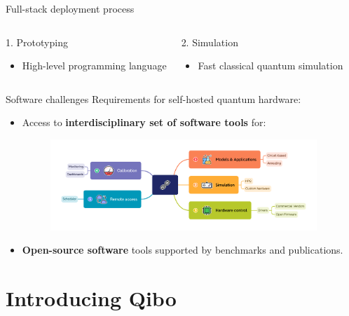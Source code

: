 \documentclass[aspectratio=169, 8pt, xcolor={svgnames}, hyperref={linkcolor=black}]{beamer}
\begin{document}
\begin{frame}{Full-stack deployment process}
\begin{columns}
\begin{block}{1. Prototyping}
     \begin{itemize}
       \item High-level programming language
     \end{itemize}
     \end{block}
     \begin{exampleblock}{2. Simulation}
       \begin{itemize}
         \item Fast classical quantum simulation
       \end{itemize}
   \end{exampleblock}
   \end{columns}
 \end{frame}

\begin{frame}{Software challenges}
   Requirements for self-hosted quantum hardware:
   \begin{itemize}
   \item[1.] Access to {\color{violet} \bf interdisciplinary set of software tools} for:
   \begin{figure}
     \includegraphics[width=0.95\textwidth]{figures/challenges.pdf}
   \end{figure}
     \item[2.] {\bf \color{teal} Open-source software} tools supported by benchmarks and publications.
   \end{itemize}
 \end{frame}

\section{Introducing Qibo}
\end{document}
